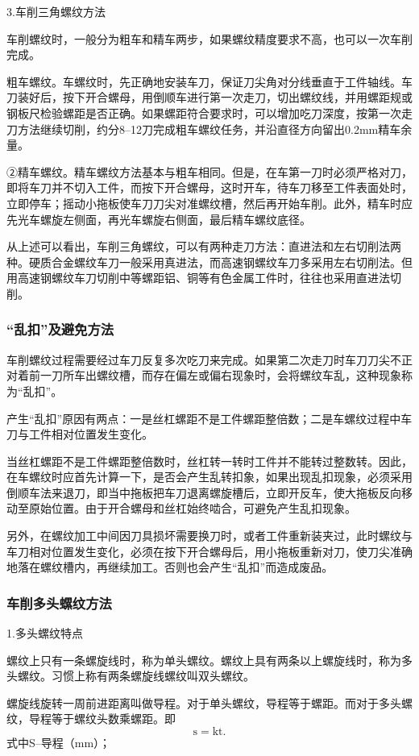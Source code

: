 \documentclass{ctexbook}
\begin{document}
3.车削三角螺纹方法

车削螺纹时，一般分为粗车和精车两步，如果螺纹精度要求不高，也可以一次车削完成。

粗车螺纹。车螺纹时，先正确地安装车刀，保证刀尖角对分线垂直于工件轴线。车刀装好后，按下开合螺母，用倒顺车进行第一次走刀，切出螺纹线，并用螺距规或钢板尺检验螺距是否正确。如果螺距符合要求时，可以增加吃刀深度，按第一次走刀方法继续切削，约分8--12刀完成粗车螺纹任务，并沿直径方向留出0.2mm精车余量。

②精车螺纹。精车螺纹方法基本与粗车相同。但是，在车第一刀时必须严格对刀，即将车刀并不切入工件，而按下开合螺母，这时开车，待车刀移至工件表面处时，立即停车；摇动小拖板使车刀刀尖对准螺纹槽，然后再开始车削。此外，精车时应先光车螺旋左侧面，再光车螺旋右侧面，最后精车螺纹底径。

从上述可以看出，车削三角螺纹，可以有两种走刀方法：直进法和左右切削法两种。硬质合金螺纹车刀一般采用真进法，而高速钢螺纹车刀多采用左右切削法。但用高速钢螺纹车刀切削中等螺距铝、铜等有色金属工件时，往往也采用直进法切削。
\subsubsection{“乱扣”及避免方法}
车削螺纹过程需要经过车刀反复多次吃刀来完成。如果第二次走刀时车刀刀尖不正对着前一刀所车出螺纹槽，而存在偏左或偏右现象时，会将螺纹车乱，这种现象称为“乱扣”。

产生“乱扣”原因有两点：一是丝杠螺距不是工件螺距整倍数；二是车螺纹过程中车刀与工件相对位置发生变化。

当丝杠螺距不是工件螺距整倍数时，丝杠转一转时工件并不能转过整数转。因此，在车螺纹时应首先计算一下，是否会产生乱转扣象，如果出现乱扣现象，必须采用倒顺车法来退刀，即当中拖板把车刀退离螺旋槽后，立即开反车，使大拖板反向移动至原始位置。由于开合螺母和丝杠始终啮合，可避免产生乱扣现象。

另外，在螺纹加工中间因刀具损坏需要换刀时，或者工件重新装夹过，此时螺纹与车刀相对位置发生变化，必须在按下开合螺母后，用小拖板重新对刀，使刀尖准确地落在螺纹槽内，再继续加工。否则也会产生“乱扣”而造成废品。
\subsubsection{车削多头螺纹方法}
1.多头螺纹特点

螺纹上只有一条螺旋线时，称为单头螺纹。螺纹上具有两条以上螺旋线时，称为多头螺纹。习惯上称有两条螺旋线螺纹叫双头螺纹。

螺旋线旋转一周前进距离叫做导程。对于单头螺纹，导程等于螺距。而对于多头螺纹，导程等于螺纹头数乘螺距。即
\begin{equation*}
	\text{s}=\text{kt}.
\end{equation*}
式中S--导程（mm）；
\end{document}
